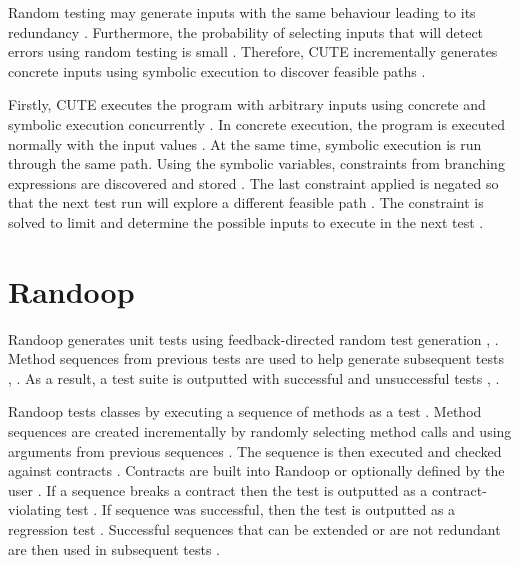 Random testing may generate inputs with the same behaviour leading to its redundancy \cite{CUTE}. Furthermore, the probability of selecting inputs that will detect errors using random testing is small \cite{CUTE}. 
Therefore, CUTE incrementally generates concrete inputs using symbolic execution to discover feasible paths \cite{CUTE}.

Firstly, CUTE executes the program with arbitrary inputs using concrete and symbolic execution concurrently \cite{CUTE}.
In concrete execution, the program is executed normally with the input values \cite{CUTE}. At the same time, symbolic execution is run through the same path. Using the symbolic variables, constraints from branching expressions are discovered and stored \cite{CUTE}. The last constraint applied is negated so that the next test run will explore a different feasible path \cite{CUTE}. The constraint is solved to limit and determine the possible inputs to execute in the next test \cite{CUTE}.


\section{Randoop}
Randoop generates unit tests using feedback-directed random test generation \cite{randoopAll}, \cite{randoopJava}. Method sequences from previous tests are used to help generate subsequent tests \cite{randoopAll}, \cite{randoopJava}.
As a result, a test suite is outputted with successful and unsuccessful tests \cite{randoopAll}, \cite{randoopJava}.

Randoop tests classes by executing a sequence of methods as a test \cite{randoopJava}. Method sequences are created incrementally by randomly selecting method calls and using arguments from previous sequences \cite{randoopJava}.
The sequence is then executed and checked against contracts \cite{randoopAll}.
Contracts are built into Randoop or optionally defined by the user \cite{randoopAll}.
If a sequence breaks a contract then the test is outputted as a contract-violating test \cite{randoopAll}. If sequence was successful, then the test is outputted as a regression test \cite{randoopAll}.
Successful sequences that can be extended or are not redundant are then used in subsequent tests \cite{randoopAll}.



